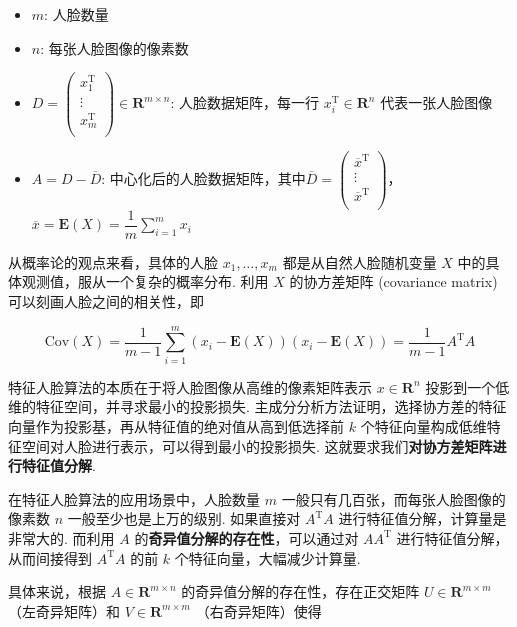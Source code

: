 \begin{itemize}
    \item $m$: 人脸数量
    \item $n$: 每张人脸图像的像素数
    \item $D = \begin{pmatrix}
        x_1^\mathrm{T} \\
        \vdots \\
        x_m^\mathrm{T} \\
    \end{pmatrix}\in \mathbf{R}^{m\times n}$: 人脸数据矩阵，每一行 $x_i^\mathrm{T} \in \mathbf{R}^n$ 代表一张人脸图像
    \item $A=D - \overline{D}$: 中心化后的人脸数据矩阵，其中$\overline{D} = \begin{pmatrix}
        \overline{x}^\mathrm{T} \\
        \vdots \\
        \overline{x}^\mathrm{T} \\
    \end{pmatrix}$，$\overline{x} = \mathbf{E}(X) = \dfrac{1}{m}\sum\limits_{i=1}^m x_i$
\end{itemize}

从概率论的观点来看，具体的人脸 $x_1, \ldots, x_m$ 都是从自然人脸随机变量 $X$ 中的具体观测值，服从一个复杂的概率分布. 利用 $X$ 的协方差矩阵 (covariance matrix) 可以刻画人脸之间的相关性，即

\[ \mathrm{Cov}(X) = \dfrac{1}{m-1}\sum_{i=1}^m (x_i - \mathbf{E}(X))(x_i - \mathbf{E}(X)) = \dfrac{1}{m-1} A^{\mathrm{T}}A \]

特征人脸算法的本质在于将人脸图像从高维的像素矩阵表示 $x\in \mathbf{R}^n$ 投影到一个低维的特征空间，并寻求最小的投影损失. 主成分分析方法证明，选择协方差的特征向量作为投影基，再从特征值的绝对值从高到低选择前 $k$ 个特征向量构成低维特征空间对人脸进行表示，可以得到最小的投影损失. 这就要求我们\textbf{对协方差矩阵进行特征值分解}.

在特征人脸算法的应用场景中，人脸数量 $m$ 一般只有几百张，而每张人脸图像的像素数 $n$ 一般至少也是上万的级别. 如果直接对 $A^{\mathrm{T}}A$ 进行特征值分解，计算量是非常大的. 而利用 $A$ 的\textbf{奇异值分解的存在性}，可以通过对 $AA^{\mathrm{T}}$ 进行特征值分解，从而间接得到 $A^{\mathrm{T}}A$ 的前 $k$ 个特征向量，大幅减少计算量.

具体来说，根据 $A\in \mathbf{R}^{m\times n}$ 的奇异值分解的存在性，存在正交矩阵 $U\in \mathbf{R}^{m\times m}$（左奇异矩阵）和 $V\in \mathbf{R}^{m\times m}$ （右奇异矩阵）使得

